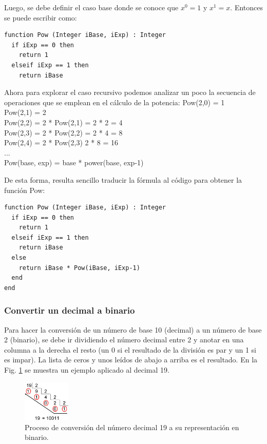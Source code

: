 Luego, se debe definir el caso base donde se conoce que $x^0 = 1$ y $x^1 = x$. Entonces se puede escribir como:

\begin{lstlisting}[upquote=true, language=pseudo]
function Pow (Integer iBase, iExp) : Integer
  if iExp == 0 then
    return 1
  elseif iExp == 1 then
    return iBase
\end{lstlisting}

Ahora para explorar el caso recursivo podemos analizar un poco la secuencia de operaciones que se emplean en el cálculo de la potencia:
Pow(2,0) = 1 \\
Pow(2,1) = 2 \\
Pow(2,2) = 2 * Pow(2,1) = 2 * 2 = 4 \\
Pow(2,3) = 2 * Pow(2,2) = 2 * 4 = 8 \\
Pow(2,4) = 2 * Pow(2,3) 2 * 8 = 16 \\
... \\
Pow(base, exp) = base * power(base, exp-1)

De esta forma, resulta sencillo traducir la fórmula al código para obtener la función Pow:

\begin{lstlisting}[upquote=true, language=pseudo]
function Pow (Integer iBase, iExp) : Integer
  if iExp == 0 then
    return 1
  elseif iExp == 1 then
    return iBase
  else
    return iBase * Pow(iBase, iExp-1)
  end
end
\end{lstlisting}

\subsubsection{Convertir un decimal a binario}

Para hacer la conversión de un número de base 10 (decimal) a un número de base 2 (binario), se debe ir dividiendo el número decimal entre 2 y anotar en una columna a la derecha el resto (un 0 si el resultado de la división es par y un 1 si es impar). La lista de ceros y unos leídos de abajo a arriba es el resultado. En la Fig. \ref{fig:Ch1decbin} se muestra un ejemplo aplicado al decimal 19.

\begin{figure}[htpb!]
  \begin{center}
    \includegraphics[width=0.2\textwidth]{images/decbin.png}
  \end{center}
  \caption{Proceso de conversión del número decimal 19 a su representación en binario.}
  \label{fig:Ch1decbin}
\end{figure}

